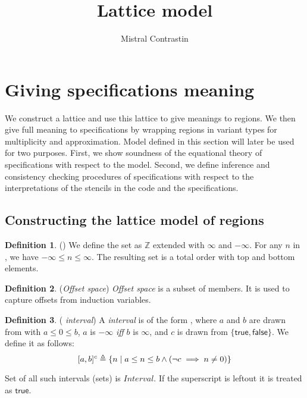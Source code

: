 \documentclass[acmlarge,review]{acmart}
\theoremstyle{definition}
\newtheorem{defn}{Definition}
\theoremstyle{plain}
\theoremstyle{remark}
\begin{document}
\title{Lattice model}
\author{Mistral Contrastin}

\section{Giving specifications meaning}

We construct a lattice and use this lattice to give meanings to regions. We
then give full meaning to specifications by wrapping regions in variant types
for multiplicity and approximation. Model defined in this section will later be
used for two purposes. First, we show soundness of the equational theory of
specifications with respect to the model. Second, we define inference and
consistency checking procedures of specifications with respect to the
interpretations of the stencils in the code and the specifications.

\subsection{Constructing the lattice model of regions}

\begin{defn}{(\zinf)}
  We define the set \zinf{} as $\mathbb{Z}$ extended with $\infty$ and
  $-\infty$. For any $n$ in \zinf{}, we have $-\infty \leq n \leq \infty$. The
  resulting set is a total order with top and bottom elements.
\end{defn}

\begin{defn}{(\emph{Offset space})}
  \emph{Offset space} is a subset of \zinf{} members. It is used to capture
  offsets from induction variables.
\end{defn}

\begin{defn}{(\emph{\zinf{} interval})}
  A \emph{\zinf{} interval} is of the form , where $a$ and $b$
  are drawn from \zinf{} with $a \leq 0 \leq b$, $a$ is $-\infty$ \emph{iff} $b$
  is $\infty$, and $c$ is drawn from $\{ \mathsf{true}, \mathsf{false} \}$. We
  define it as follows:
%
  \begin{equation*}
    \textnormal{$\lbrack a,b\rbrack^{c}$} \triangleq
      \{ n \;|\; a \leq n \leq b \wedge (\neg c \implies n \neq 0) \}
  \end{equation*}

  Set of all such intervals (sets) is $\textit{Interval}$. If the superscript is
  leftout it is treated as $\mathsf{true}$.
\end{defn}
\end{document}
